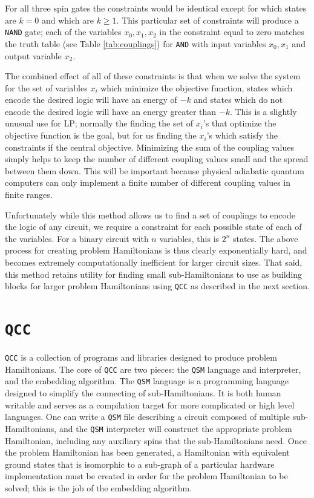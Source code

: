 For all three spin gates the constraints would be identical except for which states are $k = 0$ and which are $k \ge 1$.  This particular set of constraints will produce a \texttt{NAND} gate; each of the variables $x_0, x_1, x_2$ in the constraint equal to zero matches the truth table (see Table \ref{tab:couplings}) for \texttt{AND} with input variables $x_0, x_1$ and output variable $x_2$.

The combined effect of all of these constraints is that when we solve the system for the set of variables $x_i$ which minimize the objective function, states which encode the desired logic will have an energy of $-k$ and states which do not encode the desired logic will have an energy greater than $-k$.
This is a slightly unusual use for LP; normally the finding the set of $x_i$'s that optimize the objective function is the goal, but for us finding the $x_i$'s which satisfy the constraints if the central objective.
Minimizing the sum of the coupling values simply helps to keep the number of different coupling values small and the spread between them down.  This will be important because physical adiabatic quantum computers can only implement a finite number of different coupling values in finite ranges. 

Unfortunately while this method allows us to find a set of couplings to encode the logic of any circuit, we require a constraint for each possible state of each of the variables.  For a binary circuit with $n$ variables, this is $2^n$ states.
The above process for creating problem Hamiltonians is thus clearly exponentially hard, and becomes extremely computationally inefficient for larger circuit sizes.
That said, this method retains utility for finding small sub-Hamiltonians to use as building blocks for larger problem Hamiltonians using \texttt{QCC} as described in the next section.

\section{\texttt{QCC}}
\texttt{QCC} is a collection of programs and libraries designed to produce problem Hamiltonians.  The core of \texttt{QCC} are two pieces: the \texttt{QSM} language and interpreter, and the embedding algorithm.  The \texttt{QSM} language is a programming language designed to simplify the connecting of sub-Hamiltonians.  It is both human writable and serves as a compilation target for more complicated or high level languages.  One can write a \texttt{QSM} file describing a circuit composed of multiple sub-Hamiltonians, and the \texttt{QSM} interpreter will construct the appropriate problem Hamiltonian, including any auxiliary spins that the sub-Hamiltonians need.  Once the problem Hamiltonian has been generated, a Hamiltonian with equivalent ground states that is isomorphic to a sub-graph of a particular hardware implementation must be created in order for the problem Hamiltonian to be solved; this is the job of the embedding algorithm.

